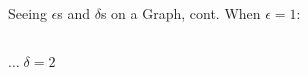 \documentclass[Cal1Spr16Lectures.tex]{subfiles}
\begin{document}
\begin{frame}{\small Seeing $\epsilon$s and $\delta$s on a Graph, cont.}\footnotesize
When $\epsilon=1$:
\vspace{-0.25pc}
\begin{columns}
\begin{column}{.36\textwidth}
\begin{block}
\end{block}
\end{column}
\begin{column}{.36\textwidth}
\begin{block}
\end{block}
\end{column}
\end{columns}
\vspace{-0.75pc}
\flushright $\dots\;\delta=2$
\end{frame}
\end{document}
